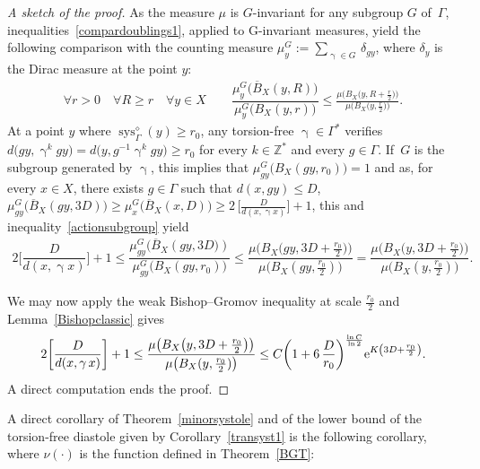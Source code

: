 \documentclass[pdftex]{sigma}
\numberwithin{equation}{section}
\newcommand{\Z}{\mathbb{Z}}
\newcommand{\sys}{\operatorname{sys}}
\newcommand{\g}{\operatorname{\gamma}}
\begin{document}
\begin{proof}[A sketch of the proof]
As the measure $\mu$ is $G$-invariant for any subgroup $G$ of~$\Gamma$, inequalities~\eqref{compardoublings1}, applied to G-invariant measures, yield the following comparison with the counting measure $\mu_{y}^{G} := \sum_{\g \in G}\, \delta_{g y}$, where $\delta_y$ is the Dirac measure at
the point $y$:
\begin{gather}\label{actionsubgroup}
\forall r > 0\quad \forall R\ge r \quad \forall y \in X \qquad
\dfrac{\mu_{y}^{G} \big(\overline B_X(y, R)\big)}{\mu_{y}^{G}\big(B_X(y, r)\big)}
\le \frac{\mu \big(B_X \big(y, R + \frac{r}{2}\big)\big)}{\mu \big(B_X \big(y, \frac{r}{2}\big)\big)}.
\end{gather}
At a point $y$ where $\sys^{\diamond}_\Gamma (y) \ge r_0$, any torsion-free $\g \in \Gamma^*$ verifies
$d\big(g y, \g^k g y\big) = d \big(y, g^{-1} \g^k g y\big) \ge r_0$ for every $k \in \Z^*$ and every $g \in \Gamma$. If~$G$ is the subgroup generated by $\g$, this
implies that $\mu_{g y}^{G} \big(B_X ( g y, r_0)\big) = 1$ and as, for every $x \in X$, there exists $g \in \Gamma$ such that $d(x, g y) \le D$,
$\mu_{gy}^{G} \big(\overline B_X(g y, 3 D)\big) \ge \mu_{x}^{G} \big(\overline B_X(x, D )\big) \ge 2\, \big[\frac{D}{d(x, \g x)}\big] + 1$, this and inequality~\eqref{actionsubgroup} yield
\begin{gather}\label{minorsystoleeq}
2\bigg[\dfrac{D}{d(x, \g x)}\bigg] \!+ 1 \le \dfrac{\mu_{gy}^{G} \big(\overline B_X(g y,3 D\big))} {\mu_{g y}^{G} \big(B_X (g y, r_0)\big)}
\le \dfrac{\mu \big(B_X \big( g y,3 D\! +\! \frac{r_0}{2}\big)\big)}{\mu \big(B_X(gy, \frac{r_0}{2})\big)} =\dfrac{\mu \big(B_X \big( y, 3 D \!+\! \frac{r_0}{2}\big)\big)}{\mu \big(B_X (y, \frac{r_0}{2})\big)}.\!\!
\end{gather}

We may now apply the weak Bishop--Gromov inequality at scale $\frac{r_0}{2}$ and Lemma~\ref{Bishopclassic} gives
\begin{gather*}
2 \bigg[ \dfrac{D}{d(x, \g x)}\bigg] + 1 \le \dfrac{\mu \big(B_X \big(y, 3D + \frac{r_0}{2}\big)\big)}{\mu \big( B_X ( y, \frac{r_0}{2})\big)}
\le C\bigg(1 + 6\,\frac{D}{r_0}\bigg)^{\frac{\ln C}{\ln 2}} {\rm e}^{K\left(3D + \frac{r_0}{2}\right)}.
\end{gather*}
A direct computation ends the proof.
\end{proof}

A direct corollary of Theorem~\ref{minorsystole} and of the lower bound of the torsion-free diastole given by Corollary~\ref{transyst1} is the following corollary,
where $ \nu (\cdot)$ is the function defined in Theorem~\ref{BGT}:
\end{document}
